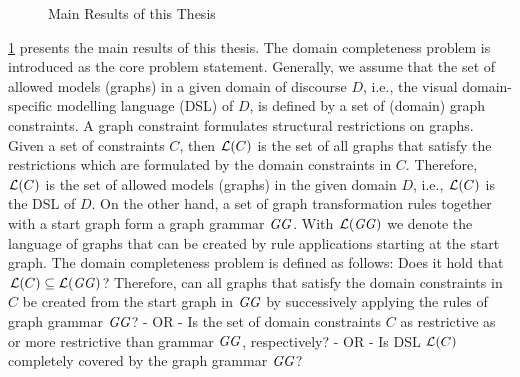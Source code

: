 \begin{figure}[!tb]
\begin{center}
\end{center}
\caption{Main Results of this Thesis}
\label{fig:sec-gen-intro-org:bp}
\end{figure}

\cref{fig:sec-gen-intro-org:bp} presents the main results of this thesis.
The domain completeness problem is introduced as the core problem statement.
Generally, we assume that the set of allowed models (graphs) in a given domain of discourse $D$, i.e., the visual domain-specific modelling language (DSL) of $D$, is defined by a set of (domain) graph constraints.
A graph constraint formulates structural restrictions on graphs.
Given a set of constraints $C$, then $\mathcal{L}(C)$ is the set of all graphs that satisfy the restrictions which are formulated by the domain constraints in $C$.
Therefore, $\mathcal{L}(C)$ is the set of allowed models (graphs) in the given domain $D$, i.e., $\mathcal{L}(C)$ is the DSL of $D$.
On the other hand, a set of graph transformation rules together with a start graph form a graph grammar $\mathit{GG}$.
With $\mathcal{L}(\mathit{GG})$ we denote the language of graphs that can be created by rule applications starting at the start graph.
The domain completeness problem is defined as follows: Does it hold that $\mathcal{L}(C) \subseteq \mathcal{L}(\mathit{GG})$?
Therefore, can all graphs that satisfy the domain constraints in $C$ be created from the start graph in $\mathit{GG}$ by successively applying the rules of graph grammar $\mathit{GG}$? - OR - Is the set of domain constraints $C$ as restrictive as or more restrictive than grammar $\mathit{GG}$, respectively? - OR - Is DSL $\mathcal{L}(C)$ completely covered by the graph grammar $\mathit{GG}$?

